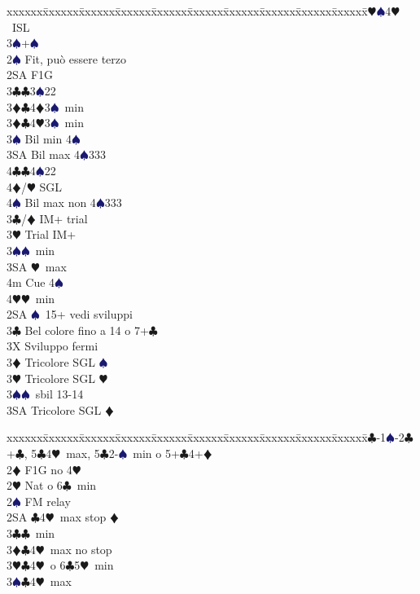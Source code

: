\documentclass[a4paper,italian]{article}
\newcommand{\BC}{\textcolor{OliveGreen}{$\clubsuit$}}
\newcommand{\BD}{\textcolor{RedOrange}{$\vardiamondsuit$}}
\newcommand{\BH}{\textcolor{Red2}{$\varheartsuit${}}}
\newcommand{\BS}{\textcolor{MidnightBlue}{$\spadesuit${}}}
\newenvironment{bidtable}
{\begin{tabbing}

    xxxxxx\=xxxxxx\=xxxxxx\=xxxxxx\=xxxxxx\=xxxxxx\=xxxxxx\=xxxxxx\=xxxxxx\=xxxxxx\=\kill}
{\end{tabbing} }%
\begin{document}
\begin{multicols}{2}
\begin{bidtable}
        3\BH {}\BS 4\BH\ ISL\\
        3\BS {}+\BS \-\\
        2\BS \> Fit, può essere terzo\+\\
        2SA \> F1G\+\\
        3\BC {}\BC 3\BS 22 \\
        3\BD {}\BC 4\BD 3\BS\ min\\
        3\BD {}\BC 4\BH 3\BS\ min\\
        3\BS \> Bil min 4\BS \\
        3SA \> Bil max 4\BS 333\\
        4\BC {}\BC 4\BS 22\\
        4\BD/\BH \> SGL\\
        4\BS \> Bil max non 4\BS333\-\\
        3\BC/\BD \> IM+ trial\\
        3\BH \> Trial IM+\+\\
        3\BS {}\BS\ min\\
        3SA \BH\ max\\
        4m \> Cue 4\BS \\
        4\BH {}\BH\ min\-\-\\
        2SA \BS\ 15+ vedi sviluppi\\
        3\BC \> Bel colore fino a 14 o 7+\BC\+\\
        3X \> Sviluppo fermi\-\\
        3\BD \> Tricolore SGL \BS \\
        3\BH \> Tricolore SGL \BH \\
        3\BS {}\BS\ sbil 13-14\\
        3SA \> Tricolore SGL \BD \-
    \end{bidtable}
    \bigbreak
    \begin{bidtable}
    1\BC-1\BS-2\BC\>+\BC, 5\BC4\BH\ max, 5\BC2-\BS\ min o 5+\BC4+\BD\+\\
        2\BD \> F1G no 4\BH \+\\
        2\BH \> Nat o 6\BC\ min\+\\
        2\BS \> FM relay\+\\
        2SA \BC 4\BH\ max stop \BD \\
        3\BC {}\BC\ min\\
        3\BD {}\BC 4\BH\ max no stop\\
        3\BH {}\BC 4\BH\ o 6\BC 5\BH\ min\\
        3\BS {}\BC 4\BH\ max\-\\

\end{bidtable}
\end{multicols}
\end{document}
